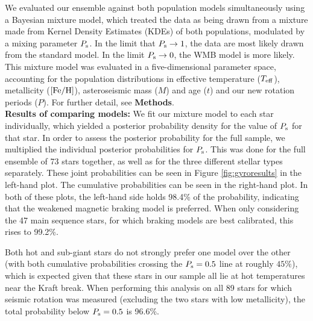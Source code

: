\documentclass[12pt]{article}
\newcommand{\feh}{\mbox{$\rm{[Fe/H]}$}\xspace}
\begin{document}
We evaluated our ensemble against both population models simultaneously using a Bayesian mixture model, which treated the data as being drawn from a mixture made from Kernel Density Estimates (KDEs) of both populations, modulated by a mixing parameter $P_{\rm s}$. In the limit that $P_{\rm s} \rightarrow 1$, the data are most likely drawn from the standard model. In the limit $P_{\rm s} \rightarrow 0$, the WMB model is more likely. This mixture model was evaluated in a five-dimensional parameter space, accounting for the population distributions in effective temperature ($T_{\rm eff}$), metallicity (\feh), asteroseismic mass ($M$) and age ($t$) and our new rotation periods ($P$). For further detail, see \textbf{Methods}.\\

\textbf{Results of comparing models:} We fit our mixture model to each star individually, which yielded a posterior probability density for the value of $P_{\rm s}$ for that star. In order to assess the posterior probability for the full sample, we multiplied the individual posterior probabilities for $P_{\rm{s}}$. This was done for the full ensemble of 73 stars together, as well as for the three different stellar types separately. These joint probabilities can be seen in Figure \ref{fig:gyroresults} in the left-hand plot. The cumulative probabilities can be seen in the right-hand plot. In both of these plots, the left-hand side holds 98.4\% of the probability, indicating that the weakened magnetic braking model is preferred. When only considering the 47 main sequence stars, for which braking models are best calibrated, this rises to 99.2\%. 

Both hot and sub-giant stars do not strongly prefer one model over the other (with both cumulative probabilities crossing the $P_{\rm{s}} = 0.5$ line at roughly $45\%$), which is expected given that these stars in our sample all lie at hot temperatures near the Kraft break. When performing this analysis on all 89 stars for which seismic rotation was measured (excluding the two stars with low metallicity), the total probability below $P_{\rm{s}} = 0.5$ is 96.6\%. \\
\end{document}
